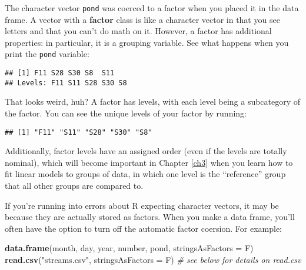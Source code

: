 \documentclass[]{book}
\newenvironment{Shaded}{\begin{snugshade}}{\end{snugshade}}
\newcommand{\KeywordTok}[1]{\textcolor[rgb]{0.13,0.29,0.53}{\textbf{#1}}}
\newcommand{\DataTypeTok}[1]{\textcolor[rgb]{0.13,0.29,0.53}{#1}}
\newcommand{\StringTok}[1]{\textcolor[rgb]{0.31,0.60,0.02}{#1}}
\newcommand{\CommentTok}[1]{\textcolor[rgb]{0.56,0.35,0.01}{\textit{#1}}}
\newcommand{\OperatorTok}[1]{\textcolor[rgb]{0.81,0.36,0.00}{\textbf{#1}}}
\newcommand{\NormalTok}[1]{#1}
\theoremstyle{definition}
\theoremstyle{definition}
\theoremstyle{definition}
\theoremstyle{remark}
\begin{document}
The character vector \texttt{pond} was coerced to a factor when you
placed it in the data frame. A vector with a \textbf{factor} class is
like a character vector in that you see letters and that you can't do
math on it. However, a factor has additional properties: in particular,
it is a grouping variable. See what happens when you print the
\texttt{pond} variable:

\begin{Shaded}
\end{Shaded}

\begin{verbatim}
## [1] F11 S28 S30 S8  S11
## Levels: F11 S11 S28 S30 S8
\end{verbatim}

That looks weird, huh? A factor has levels, with each level being a
subcategory of the factor. You can see the unique levels of your factor
by running:

\begin{Shaded}
\end{Shaded}

\begin{verbatim}
## [1] "F11" "S11" "S28" "S30" "S8"
\end{verbatim}

Additionally, factor levels have an assigned order (even if the levels
are totally nominal), which will become important in Chapter \ref{ch3}
when you learn how to fit linear models to groups of data, in which one
level is the ``reference'' group that all other groups are compared to.

If you're running into errors about R expecting character vectors, it
may be because they are actually stored as factors. When you make a data
frame, you'll often have the option to turn off the automatic factor
coersion. For example:

\begin{Shaded}
\begin{Highlighting}[]
\KeywordTok{data.frame}\NormalTok{(month, day, year, number, pond, }\DataTypeTok{stringsAsFactors =}\NormalTok{ F)}
\KeywordTok{read.csv}\NormalTok{(}\StringTok{"streams.csv"}\NormalTok{, }\DataTypeTok{stringsAsFactors =}\NormalTok{ F)  }\CommentTok{# see below for details on read.csv}
\end{Highlighting}
\end{Shaded}
\end{document}
